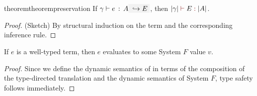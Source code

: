 





\begin{restatable}{theorem}{theorempreservation}
  \label{theorem:preservation}
  If $ \hastype \gamma e A \yields E $,
  then $ \judgeTarget {\im \gamma} E {\im A} $.
\end{restatable}
\begin{proof}
(Sketch) By structural induction on the term and the corresponding
inference rule.
\end{proof}

\begin{theorem}
  If $e$ is a well-typed \name term, then $e$ evaluates to some System $F$
  value $v$.
\end{theorem}
\begin{proof}
  Since we define the dynamic semantics of \name in terms of the composition of
  the type-directed translation and the dynamic semantics of System $F$, type safety follows immediately.
\end{proof}
